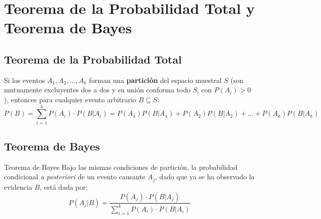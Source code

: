 \section{Teorema de la Probabilidad Total y Teorema de Bayes}

\subsection{Teorema de la Probabilidad Total}
Si los eventos $A_1, A_2, \dots, A_k$ forman una \textbf{partición} del espacio muestral $S$ (son mutuamente excluyentes dos a dos y su unión conforma todo $S$, con $P(A_i) > 0$), entonces para cualquier evento arbitrario $B \subseteq S$:
\begin{equation}
    P(B) = \sum_{i=1}^k P(A_i) \cdot P(B|A_i) = P(A_1)P(B|A_1) + P(A_2)P(B|A_2) + \dots + P(A_k)P(B|A_k)
\end{equation}

\subsection{Teorema de Bayes}
\begin{definicion}{Teorema de Bayes}
Bajo las mismas condiciones de partición, la probabilidad condicional \textit{a posteriori} de un evento causante $A_j$, dado que ya se ha observado la evidencia $B$, está dada por:
\begin{equation}
    P(A_j|B) = \frac{P(A_j) \cdot P(B|A_j)}{\sum_{i=1}^k P(A_i) \cdot P(B|A_i)}
\end{equation}
\end{definicion}

